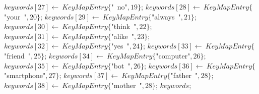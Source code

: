 \documentclass[a4paper,10pt]{article}
\begin{document}
\begin{algorithm}
\begin{algorithmic}[5]
  \STATE \(keywords[27]\gets\ KeyMapEntry\{\)"{}\ no"{}\(,19\}\);
  \STATE \(keywords[28]\gets\ KeyMapEntry\{\)"{}your\ "{}\(,20\}\);
  \STATE \(keywords[29]\gets\ KeyMapEntry\{\)"{}always\ "{}\(,21\}\);
  \STATE \(keywords[30]\gets\ KeyMapEntry\{\)"{}think\ "{}\(,22\}\);
  \STATE \(keywords[31]\gets\ KeyMapEntry\{\)"{}alike\ "{}\(,23\}\);
  \STATE \(keywords[32]\gets\ KeyMapEntry\{\)"{}yes\ "{}\(,24\}\);
  \STATE \(keywords[33]\gets\ KeyMapEntry\{\)"{}friend\ "{}\(,25\}\);
  \STATE \(keywords[34]\gets\ KeyMapEntry\{\)"{}computer"{}\(,26\}\);
  \STATE \(keywords[35]\gets\ KeyMapEntry\{\)"{}bot\ "{}\(,26\}\);
  \STATE \(keywords[36]\gets\ KeyMapEntry\{\)"{}smartphone"{}\(,27\}\);
  \STATE \(keywords[37]\gets\ KeyMapEntry\{\)"{}father\ "{}\(,28\}\);
  \STATE \(keywords[38]\gets\ KeyMapEntry\{\)"{}mother\ "{}\(,28\}\);
  \RETURN\(keywords\);

\end{algorithmic}
\end{algorithm}
\end{document}
